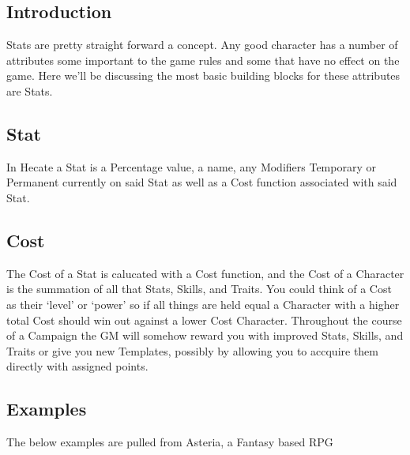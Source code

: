 
\subsection{Introduction}
Stats are pretty straight forward a concept.  Any good character
has a number of attributes some important to the game rules and
some that have no effect on the game.  Here we'll be discussing
the most basic building blocks for these attributes are Stats.

\subsection{Stat}
In Hecate a \gls{Stat} is a Percentage value, a name, any
\glspl{Modifier} Temporary or Permanent currently on said \gls{Stat}
as well as a \gls{Cost} function associated with said \gls{Stat}.

\subsection{Cost}
The \gls{Cost} of a \gls{Stat} is calucated with a \gls{Cost}
function, and the \gls{Cost} of a \gls{Character} is the summation
of all that  \glspl{Stat},
\glspl{Skill}, and \glspl{Trait}.  You could think of a
 \gls{Cost} as their `level' or `power'
so if all things are held equal a \gls{Character} with a higher
total \gls{Cost} should win out against a lower \gls{Cost}
\gls{Character}.  Throughout the course of a \gls{Campaign} the
\gls{GM} will somehow reward you with improved \glspl{Stat}, \glspl{Skill},
and \glspl{Trait} or give you new \glspl{Template}, possibly by
allowing you to accquire them directly with assigned points.

\subsection{Examples}
The below examples are pulled from Asteria, a Fantasy based \gls{RPG}

